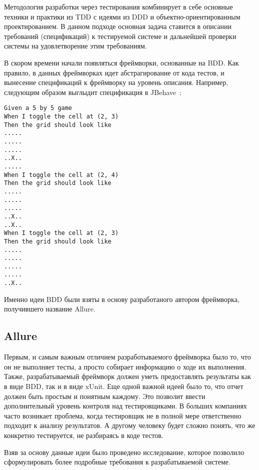 Методология разработки через тестирования комбинирует в себе основные техники и практики из TDD с идеями из DDD и объектно-ориентированным проектированием. В данном подходе основная задача ставится в описании требований (спецификаций) к тестируемой системе и дальнейшей проверки системы на удовлетворение этим требованиям. 

В скором времени начали появляться фреймворки, основанные на BDD. Как правило, в данных фреймворках идет абстрагирование от кода тестов, и вынесение спецификаций к фреймворку на уровень описания. Например, следующим образом выглыдит спецификация в JBehave~\cite{jbehave_home}:

\begin{lstlisting}[caption=Пример спецификации JBehave]
Given a 5 by 5 game
When I toggle the cell at (2, 3)
Then the grid should look like
.....
.....
.....
..X..
.....
When I toggle the cell at (2, 4)
Then the grid should look like
.....
.....
.....
..X..
..X..
When I toggle the cell at (2, 3)
Then the grid should look like
.....
.....
.....
.....
..X..
\end{lstlisting}

Именно идеи BDD были взяты в основу разработаного автором фреймворка, получившего название Allure.

\subsection{Allure}

Первым, и самым важным отличием разработываемого фреймворка было то, что он не выполняет тесты, а просто собирает информацию о ходе их выполнения. Также, разрабатываемый фреймворк должен уметь предоставлять результаты как в виде BDD, так и в виде xUnit. Еще одной важной идеей было то, что отчет должен быть простым и понятным каждому. Это позволит ввести дополнительный уровень контроля над тестировщиками. В больших компаниях часто возникает проблема, когда тестировщик не в полной мере ответственно подходит к анализу результатов. А другому человеку будет сложно понять, что же конкретно тестируется, не разбираясь в коде тестов. 

Взяв за основу данные идеи было проведено исследование, которое позволило сформулировать более подробные требования к разрабатываемой системе.
